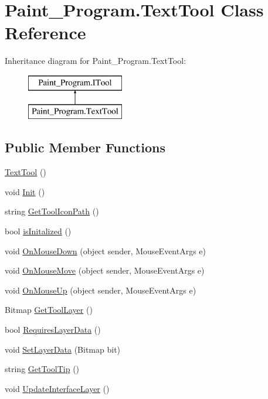 \hypertarget{class_paint___program_1_1_text_tool}{}\section{Paint\+\_\+\+Program.\+Text\+Tool Class Reference}
\label{class_paint___program_1_1_text_tool}
Inheritance diagram for Paint\+\_\+\+Program.\+Text\+Tool\+:\begin{figure}[H]
\begin{center}
\leavevmode
\includegraphics[height=2.000000cm]{class_paint___program_1_1_text_tool}
\end{center}
\end{figure}
\subsection*{Public Member Functions}
\begin{DoxyCompactItemize}
\item 
\mbox{\hyperlink{class_paint___program_1_1_text_tool_a600ec6a0003ca544a857f7e6a79f5688}{Text\+Tool}} ()
\item 
void \mbox{\hyperlink{class_paint___program_1_1_text_tool_a8351e31f6387ff80cbff288a73a10a3d}{Init}} ()
\item 
string \mbox{\hyperlink{class_paint___program_1_1_text_tool_a0adfe4c942f7d97c2d9cf626fb3b78c7}{Get\+Tool\+Icon\+Path}} ()
\item 
bool \mbox{\hyperlink{class_paint___program_1_1_text_tool_a053b13ff961f302f816b57ab5c48952a}{is\+Initalized}} ()
\item 
void \mbox{\hyperlink{class_paint___program_1_1_text_tool_a56294ea8e94d8aa58282660c24eb74bb}{On\+Mouse\+Down}} (object sender, Mouse\+Event\+Args e)
\item 
void \mbox{\hyperlink{class_paint___program_1_1_text_tool_a25bd60db2eeff1a131bce076e7f68757}{On\+Mouse\+Move}} (object sender, Mouse\+Event\+Args e)
\item 
void \mbox{\hyperlink{class_paint___program_1_1_text_tool_a0b77db4478e19cd1f957c37af981fbf5}{On\+Mouse\+Up}} (object sender, Mouse\+Event\+Args e)
\item 
Bitmap \mbox{\hyperlink{class_paint___program_1_1_text_tool_acb2114b449f982664f1fd49e3bb0b017}{Get\+Tool\+Layer}} ()
\item 
bool \mbox{\hyperlink{class_paint___program_1_1_text_tool_a6fdb8fac7060beb3677489c709a7913f}{Requires\+Layer\+Data}} ()
\item 
void \mbox{\hyperlink{class_paint___program_1_1_text_tool_a3022ee066b3c9dfdff596027c3a184ed}{Set\+Layer\+Data}} (Bitmap bit)
\item 
string \mbox{\hyperlink{class_paint___program_1_1_text_tool_a39c92c312fa71a01a3ce97c2c0293c25}{Get\+Tool\+Tip}} ()
\item 
void \mbox{\hyperlink{class_paint___program_1_1_text_tool_a7fdf6ff8d7fa9bf43cbb4c6668862f2c}{Update\+Interface\+Layer}} ()
\end{DoxyCompactItemize}

